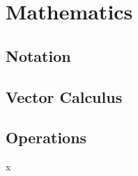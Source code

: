 \clearemptydoublepage
\chapter{Mathematics}
\label{cha:maths}

\section{Notation}


\section{Vector Calculus}


\section{Operations}


\clearpage
x
